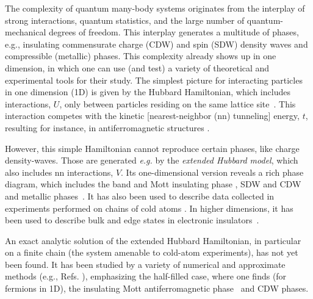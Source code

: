 \documentclass[aps,prl,showpacs,twocolumn,superscriptaddress]{revtex4-2}
\begin{document}

\maketitle




 The complexity of quantum many-body systems originates from the interplay of strong
interactions, quantum statistics, and the large number of quantum-mechanical degrees of
freedom. This interplay generates a multitude of phases, e.g., insulating commensurate charge (CDW) and spin (SDW) density waves and compressible (metallic) phases. This complexity already shows up in one dimension, in which one can use (and test) a variety of theoretical and experimental tools for their study. The simplest picture for interacting particles in one dimension  (1D)  is given by  the Hubbard Hamiltonian, which includes interactions, $U$, only between particles residing on the same lattice site~\cite{hubbard}. This interaction competes with the kinetic [nearest-neighbor (nn) tunneling] energy, $t$, resulting for instance, in antiferromagnetic structures \cite{Anderson}.


However, this simple  Hamiltonian cannot reproduce certain phases, like charge  density-waves.
Those are generated {\it e.g.} by the {\it extended Hubbard model}, which also includes nn interactions, $V$. Its one-dimensional version   reveals a rich phase diagram, which includes the band and Mott insulating phase \cite{Mott},  SDW and CDW and metallic phases~\cite{Mila,Ejima,Glocke,Zhang}.  It has also been used to describe data collected in experiments performed on chains of cold atoms \cite{bloch,guan}. In higher dimensions, it has been used to describe  bulk and edge states in electronic insulators~\cite{HF}.






An exact analytic solution of the extended Hubbard Hamiltonian, in particular  on a finite chain (the system amenable to cold-atom experiments), has not yet been found. It has been studied  by  a variety of numerical and approximate methods (e.g., Refs. \cite{hirsch,Nishino,Furusaki,Spalding,phased,Philoxene}), emphasizing  the  half-filled case, where one finds (for fermions in 1D), the insulating Mott antiferromagnetic phase~\cite{Mott} and CDW phases.
\end{document}

